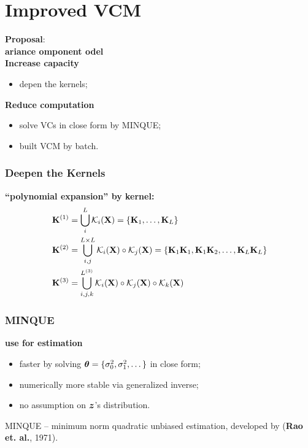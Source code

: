 \documentclass{beamer}
\newcommand{\kn}{\mathcal{K}} %
\begin{document}
\section{Improved VCM}
\begin{frame}
  \large{\textbf{Proposal}}: \\
  \large{\textbf{ ariance omponent odel}} \\
  \textbf{Increase capacity}
  \begin{itemize}
  \item depen the kernels;
  \end{itemize}
  \textbf{Reduce computation}
  \begin{itemize}
  \item solve VCs in close form by MINQUE;
  \item built VCM by batch.
  \end{itemize}
\end{frame}
\begin{frame}%
  \frametitle{Deepen the Kernels}
  \textbf{``polynomial expansion'' by kernel:}
  \begin{align*}
    \xk^{(1)} & = \bigcup_{i}^L \kn_i(\xx) = \{\xk_1, \dots, \xk_L\} \\
    \xk^{(2)} & = \bigcup_{i,j}^{L \times L} \kn_i(\xx) \circ \kn_j(\xx) = \{\xk_1\xk_1, \xk_1\xk_2, \dots, \xk_L\xk_L\} \\
    \xk^{(3)} & = \bigcup_{i,j,k}^{L^{(3)}}  \kn_i(\xx) \circ \kn_j(\xx) \circ \kn_k(\xx)
  \end{align*}
\end{frame}
\begin{frame} %
  \frametitle{MINQUE} %
  \textbf{use  for estimation}
  \begin{itemize}
  \item faster by solving ${\bm{\theta}}=\{\sigma_0^2, \sigma_1^2, \dots \}$
    in close form;
  \item numerically more stable via generalized inverse;
  \item no assumption on ${\bm{z}}$'s distribution.
  \end{itemize}
  MINQUE -- minimum norm quadratic unbiased estimation, developed
  by (\textbf{Rao et. al.}, 1971).
\end{frame}
\end{document}
